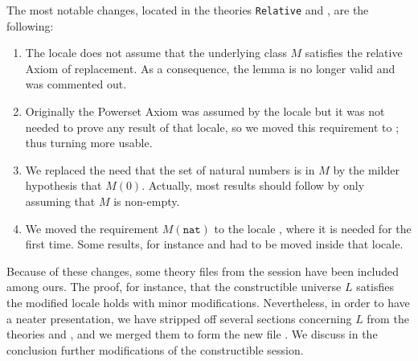 The most notable changes, located in the theories \texttt{Relative}
and , are
the following:
\begin{enumerate}
\item\label{item:1} The locale 
  does not assume that the underlying class $M$ satisfies the relative
  Axiom of replacement.  As a consequence, the lemma
   is no longer valid and was commented
  out.
\item\label{item:2} Originally the Powerset Axiom was assumed by the
  locale  but it was not needed to prove any result
  of that locale, so we moved this requirement to ;
  thus turning  more usable.
\item\label{item:3} We replaced the need that the set of natural
  numbers is in $M$ by the   milder hypothesis that $M(0)$. Actually,
  most results should follow 
  by only assuming that $M$ is non-empty.
\item We moved the requirement $M(\mathtt{nat})$ to the locale
  , where it is needed for the first time. Some results,
  for instance  and 
   had to be moved inside that
  locale. 
\end{enumerate}
Because of these changes, some theory files from the
 session have been included among ours. The
proof, for instance, that the constructible universe $L$ satisfies the
modified locale  holds with minor
modifications. Nevertheless, in order to have a neater presentation,
we have stripped off several sections concerning $L$ from the theories
 and , and we merged them to form
the new file . We discuss in the conclusion further
modifications of the constructible session.

